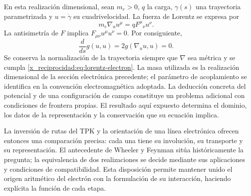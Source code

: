 En esta realización dimensional, sean \(m_e>0\), \(q\) la carga,
\(\gamma(s)\) una trayectoria parametrizada y \(u=\dot\gamma\)
su cuadrivelocidad. La fuerza de Lorentz se expresa por
\begin{equation}
 m_e\nabla_u u^\mu=qF^\mu{}_{\nu}u^\nu.
 \label{x_reciprocidad:eq:lorentz-electron}
\end{equation}
La antisimetría de \(F\) implica
\(F_{\mu\nu}u^\mu u^\nu=0\). Por consiguiente,
\[
 \frac{d}{ds}g(u,u)=2g(\nabla_u u,u)=0.
\]
Se conserva la normalización de la trayectoria siempre que \(\nabla\)
sea métrica y se cumpla \eqref{x_reciprocidad:eq:lorentz-electron}. La masa utilizada
es la realización dimensional de la sección electrónica precedente;
el parámetro de acoplamiento se identifica en la convención electromagnética
adoptada. La deducción concreta del potencial y de una configuración
de campo constituye un problema adicional con condiciones de frontera
propias. El resultado aquí expuesto determina el dominio, los datos
de la representación y la conservación que su ecuación implica.

La inversión de rutas del TPK y la orientación de una línea electrónica
ofrecen entonces una comparación precisa: cada una tiene su involución,
su transporte y su representación. El antecedente de Wheeler y Feynman
sitúa históricamente la pregunta; la equivalencia de dos realizaciones
se decide mediante sus aplicaciones y condiciones de compatibilidad.
Esta disposición permite mantener unido el origen aritmético del electrón
con la formulación de su interacción, haciendo explícita la función
de cada etapa.


